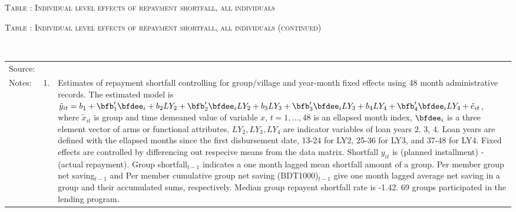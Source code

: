 \hspace{-1cm}\begin{minipage}[t]{14cm}
\hfil\textsc{\normalsize Table \thetable: Individual level effects of repayment shortfall, all individuals\label{tab shortfall indiv}}\\
\setlength{\tabcolsep}{1pt}
\setlength{\baselineskip}{8pt}
\renewcommand{\arraystretch}{.6}
\hfil{}
\end{minipage}

\addtocounter{table}{-1}
\hspace{-1cm}\begin{minipage}[t]{14cm}
\hfil\textsc{\normalsize Table \thetable: Individual level effects of repayment shortfall, all individuals (continued)\label{tab shortfall indiv2}}\\
\setlength{\tabcolsep}{1pt}
\setlength{\baselineskip}{8pt}
\renewcommand{\arraystretch}{.6}
\hfil{}\\
\renewcommand{\arraystretch}{.8}
\setlength{\tabcolsep}{1pt}
\begin{tabular}{>{\hfill\scriptsize}p{1cm}<{}>{\hfill\scriptsize}p{.25cm}<{}>{\scriptsize}p{12cm}<{\hfill}}
Source:& \multicolumn{2}{l}{\scriptsize Estimated with GUK administrative data.}\\
Notes: & 1. & Estimates of repayment shortfall controlling for group/village and year-month fixed effects using 48 month administrative records. The estimated model is $\tilde{y}_{it}=b_{1}+\bfb'_{1}\bfdee_{i}+b_{2}LY_{2}+\bfb'_{2}\bfdee_{i}LY_{2}+b_{3}LY_{3}+\bfb'_{3}\bfdee_{i}LY_{3}+b_{4}LY_{4}+\bfb'_{4}\bfdee_{i}LY_{4}+\tilde{e}_{it}$, where $\tilde{x}_{it}$ is group and time demeaned value of variable $x$, $t=1,\dots, 48$ is an ellapsed month index, $\bfdee_{i}$ is a three element vector of arms or functional attributes, $LY_{2}, LY_{3}, LY_{4}$ are indicator variables of loan years 2, 3, 4. Loan years are defined with the ellapsed months since the first disbursement date, 13-24 for \textsf{LY2}, 25-36 for \textsf{LY3}, and 37-48 for \textsf{LY4}. Fixed effects are controlled by differencing out respecive means from the data matrix. Shortfall $y_{it}$ is (planned installment) - (actual repayment). \textsf{Group shortfall}$_{t-1}$ indicates a one month lagged mean shortfall amount of a group. \textsf{Per member group net saving}$_{t-1}$ and \textsf{Per member cumulative group net saving (BDT1000)}$_{t-1}$ give one month lagged average net saving in a group and their accumulated sums, respectively. Median group repayent shortfall rate is -1.42. 69 groups participated in the lending program. \\

\end{tabular}
\end{minipage}

